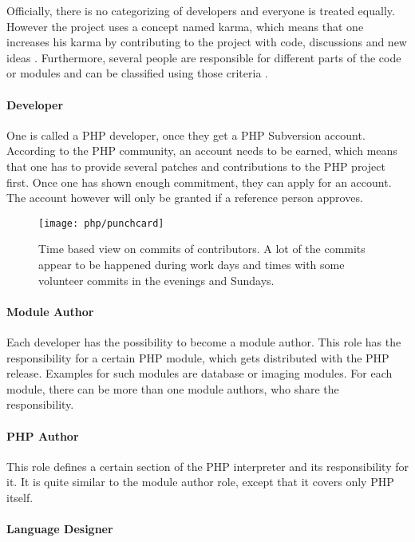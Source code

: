 Officially, there is no categorizing of developers and everyone is treated
equally. However the project uses a concept named karma, which means
that one increases his karma by contributing to the project with code,
discussions and new ideas \cite{Magnusson2010}. Furthermore, several people are
responsible for different parts of the code or modules and can be classified
using those criteria \cite{PHPCredits}.

\paragraph{Developer}

One is called a PHP developer, once they get a PHP Subversion account.
According to the PHP community, an account needs to be earned, which means that
one has to provide several patches and contributions to the PHP project first.
Once one has shown enough commitment, they can apply for an account. The
account however will only be granted if a reference person approves.

\begin{figure}[htbp]
  \centering
  \texttt{[image: php/punchcard]}
  \caption[Time Based View on Commits, PHP]
  {Time based view on commits of contributors. A lot of the commits appear to
    be happened during work days and times with some volunteer commits in the
    evenings and Sundays.}
\end{figure}

\paragraph{Module Author}

Each developer has the possibility to become a module author. This role has the
responsibility for a certain PHP module, which gets distributed with the PHP
release. Examples for such modules are database or imaging modules. For each
module, there can be more than one module authors, who share the
responsibility.

\paragraph{PHP Author}

This role defines a certain section of the PHP interpreter and its
responsibility for it. It is quite similar to the module author role, except
that it covers only PHP itself.

\paragraph{Language Designer}

